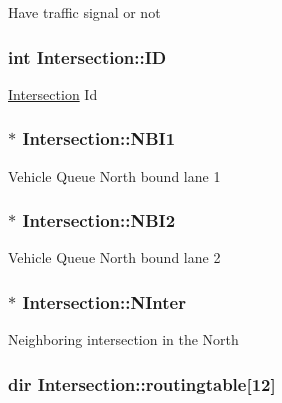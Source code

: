 Have traffic signal or not \hypertarget{class_intersection_aec0f4beb4f24b87b7f47aa6e23b7f4dd}{
\subsubsection[{I\-D}]{\setlength{\rightskip}{0pt plus 5cm}int Intersection\-::\-I\-D\hspace{0.3cm}{\ttfamily [protected]}}}\label{class_intersection_aec0f4beb4f24b87b7f47aa6e23b7f4dd}
\hyperlink{class_intersection}{Intersection} Id \hypertarget{class_intersection_aba3182ae5b832420344bc8fccf5c285b}{
\subsubsection[{N\-B\-I1}]{$\ast$ Intersection\-::\-N\-B\-I1}}\label{class_intersection_aba3182ae5b832420344bc8fccf5c285b}
Vehicle Queue North bound lane 1 \hypertarget{class_intersection_af19480d80bcd05c9b3d6fff9e1e829d7}{
\subsubsection[{N\-B\-I2}]{$\ast$ Intersection\-::\-N\-B\-I2}}\label{class_intersection_af19480d80bcd05c9b3d6fff9e1e829d7}
Vehicle Queue North bound lane 2 \hypertarget{class_intersection_a577edea4aa08d05052e6cbf7aa2ba9e2}{
\subsubsection[{N\-Inter}]{$\ast$ Intersection\-::\-N\-Inter}}\label{class_intersection_a577edea4aa08d05052e6cbf7aa2ba9e2}
Neighboring intersection in the North \hypertarget{class_intersection_a87a7802a02ff65c92a6fd11c70144ca2}{
\subsubsection[{routingtable}]{\setlength{\rightskip}{0pt plus 5cm}dir Intersection\-::routingtable\mbox{[}12\mbox{]}}}\label{class_intersection_a87a7802a02ff65c92a6fd11c70144ca2}
